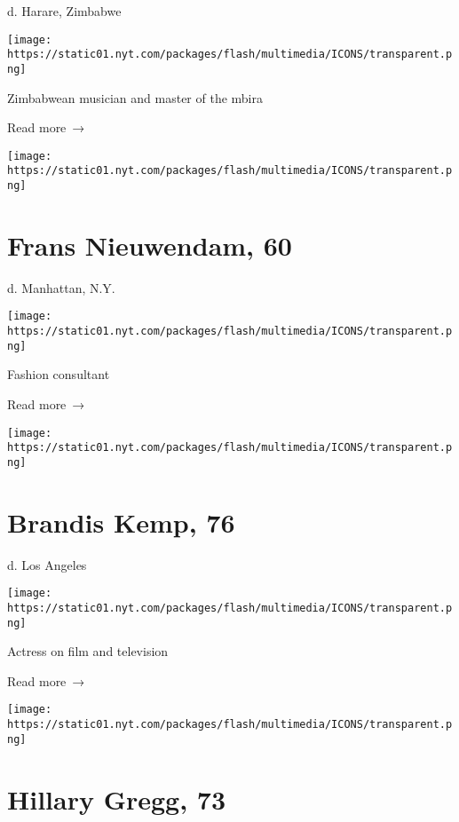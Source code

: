 d. Harare, Zimbabwe

\texttt{[image: https://static01.nyt.com/packages/flash/multimedia/ICONS/transparent.png]}

Zimbabwean musician and master of the mbira

 Read more~→

\href{https://www.nytimes.com/2020/07/18/obituaries/frans-nieuwendam-dead-coronavirus.html}{}

\texttt{[image: https://static01.nyt.com/packages/flash/multimedia/ICONS/transparent.png]}

\hypertarget{frans-nieuwendam-60}{%
\section{Frans Nieuwendam, 60}\label{frans-nieuwendam-60}}

d. Manhattan, N.Y.

\texttt{[image: https://static01.nyt.com/packages/flash/multimedia/ICONS/transparent.png]}

Fashion consultant

 Read more~→

\href{https://www.nytimes.com/2020/07/17/obituaries/brandis-kemp-dead-coronavirus.html}{}

\texttt{[image: https://static01.nyt.com/packages/flash/multimedia/ICONS/transparent.png]}

\hypertarget{brandis-kemp-76}{%
\section{Brandis Kemp, 76}\label{brandis-kemp-76}}

d. Los Angeles

\texttt{[image: https://static01.nyt.com/packages/flash/multimedia/ICONS/transparent.png]}

Actress on film and television

 Read more~→

\href{https://www.nytimes.com/2020/07/16/obituaries/hillary-gregg-dead-coronavirus.html}{}

\texttt{[image: https://static01.nyt.com/packages/flash/multimedia/ICONS/transparent.png]}

\hypertarget{hillary-gregg-73}{%
\section{Hillary Gregg, 73}\label{hillary-gregg-73}}


